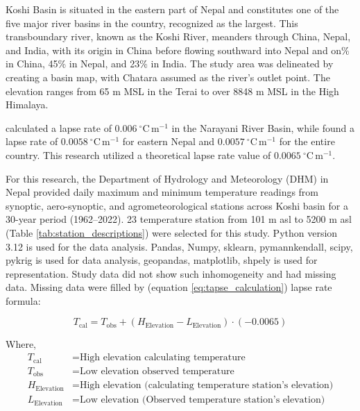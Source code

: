 
Koshi Basin is situated in the eastern part of Nepal and constitutes one of the five major river basins in the country, recognized as the largest. This transboundary river, known as the Koshi River, meanders through China, Nepal, and India, with its origin in China before flowing southward into Nepal and on\% in China, 45\% in Nepal, and 23\% in India. The study area was delineated by creating a basin map, with Chatara assumed as the river's outlet point. The elevation ranges from 65 m MSL in the Terai to over 8848 m MSL in the High Himalaya.


\citet{chand_trend_2019} calculated a lapse rate of \(0.006 \ ^\circ \mathrm{C} \, \mathrm{m}^{-1}\) in the Narayani River Basin, while \citet{nayava_spatial_2017} found a lapse rate of \(0.0058 \ ^\circ \mathrm{C} \, \mathrm{m}^{-1}\) for eastern Nepal and \(0.0057 \ ^\circ \mathrm{C} \, \mathrm{m}^{-1}\) for the entire country. This research utilized a theoretical lapse rate value of \(0.0065 \ ^\circ \mathrm{C} \, \mathrm{m}^{-1}\).


For this research, the Department of Hydrology and Meteorology (DHM) in Nepal provided daily maximum and minimum temperature readings from synoptic, aero-synoptic, and agrometeorological stations across Koshi basin for a 30-year period (1962--2022). 23 temperature station from 101 m asl to 5200 m asl (Table \ref{tab:station_descriptions}) were selected for this study. Python version 3.12 is used for the data analysis. Pandas, Numpy, sklearn, pymannkendall, scipy, pykrig is used for data analysis, geopandas, matplotlib, shpely is used for representation. Study data did not show such inhomogeneity and had missing data. Missing data were filled by (equation \ref{eq:tapse_calculation}) lapse rate formula:

\begin{equation}
  T_{\text{cal}} = T_{\text{obs}} + (H_{\text{Elevation}} - L_{\text{Elevation}}) \cdot (-0.0065)
  \label{eq:tapse_calculation}
  \end{equation}
  
  Where, 
  \begin{align*}
  T_{\text{cal}} & = \text{High elevation calculating temperature} \\
  T_{\text{obs}} & = \text{Low elevation observed temperature} \\
  H_{\text{Elevation}} & = \text{High elevation (calculating temperature station's elevation)}  \\
  L_{\text{Elevation}} & = \text{Low elevation (Observed temperature station's elevation)}   
  \end{align*}


